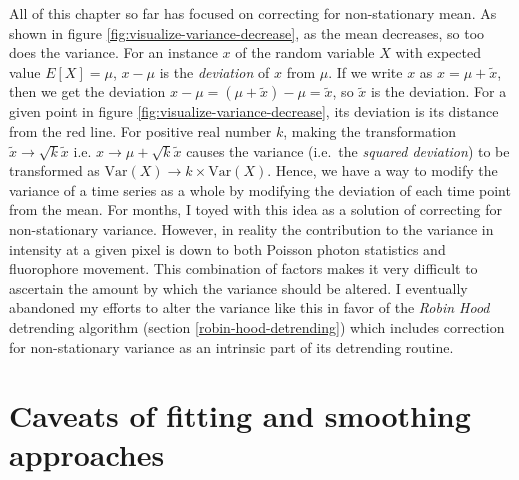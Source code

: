 \documentclass[12pt,]{book}
\theoremstyle{definition}
\theoremstyle{definition}
\theoremstyle{definition}
\theoremstyle{remark}
\begin{document}
All of this chapter so far has focused on correcting for non-stationary
mean. As shown in figure \ref{fig:visualize-variance-decrease}, as the
mean decreases, so too does the variance. For an instance \(x\) of the
random variable \(X\) with expected value \(E[X] = \mu\), \(x - \mu\) is
the \emph{deviation} of \(x\) from \(\mu\). If we write \(x\) as
\(x = \mu + \tilde{x}\), then we get the deviation
\(x - \mu = (\mu + \tilde{x}) - \mu = \tilde{x}\), so \(\tilde{x}\) is
the deviation. For a given point in figure
\ref{fig:visualize-variance-decrease}, its deviation is its distance
from the red line. For positive real number \(k\), making the
transformation \(\tilde{x} \rightarrow \sqrt{k}\tilde{x}\) i.e.
\(x \rightarrow \mu + \sqrt{k}\tilde{x}\) causes the variance (i.e.~the
\emph{squared deviation}) to be transformed as
\(\text{Var}(X) \rightarrow k \times \text{Var}(X)\). Hence, we have a
way to modify the variance of a time series as a whole by modifying the
deviation of each time point from the mean. For months, I toyed with
this idea as a solution of correcting for non-stationary variance.
However, in reality the contribution to the variance in intensity at a
given pixel is down to both Poisson photon statistics and fluorophore
movement. This combination of factors makes it very difficult to
ascertain the amount by which the variance should be altered. I
eventually abandoned my efforts to alter the variance like this in favor
of the \emph{Robin Hood} detrending algorithm (section
\ref{robin-hood-detrending}) which includes correction for
non-stationary variance as an intrinsic part of its detrending routine.

\section{Caveats of fitting and smoothing
approaches}\label{caveats-of-fitting-and-smoothing-approaches}
\end{document}
